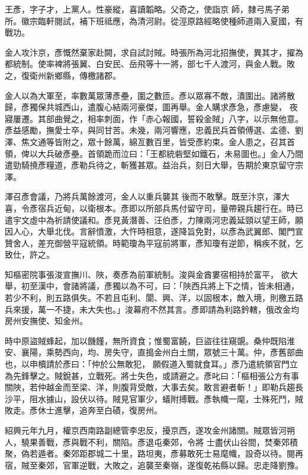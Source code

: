 \begin{pinyinscope}
 王彥，字子才，上黨人。性豪縱，喜讀韜略。父奇之，使詣京
 師，隸弓馬子弟所。徽宗臨軒閱試，補下班祗應，為清河尉。從涇原路經略使種師道兩入夏國，有戰功。



 金人攻汴京，彥慨然棄家赴闕，求自試討賊。時張所為河北招撫使，異其才，擢為都統制。使率裨將張翼、白安民、岳飛等十一將，部七千人渡河，與金人戰。敗之，復衛州新鄉縣，傳檄諸郡。



 金人以為大軍至，率數萬眾薄彥壘，圍之數匝。彥以眾寡不敵，潰圍出。諸將散歸，彥獨保共城西山，遣腹心結兩河豪傑，圖再舉。金人購求彥急，彥慮變，
 夜寢屢遷。其部曲覺之，相率刺面，作「赤心報國，誓殺金賊」八字，以示無他意。彥益感勵，撫愛士卒，與同甘苦。未幾，兩河響應，忠義民兵首領傅選、孟德、劉澤、焦文通等皆附之，眾十餘萬，綿亙數百里，皆受彥約束。金人患之，召其首領，俾以大兵破彥壘。首領跪而泣曰：「王都統砦堅如鐵石，未易圖也。」金人乃間遣勁騎撓彥糧道，彥勒兵待之，斬獲甚眾。益治兵，刻日大舉，告期於東京留守宗澤。



 澤召彥會議，乃將兵萬餘渡河，金人以重兵襲其
 後而不敢擊。既至汴京，澤大喜，令彥宿兵近甸，以衛根本。彥即以所部兵馬付留守司，量帶親兵趨行在。時已遣宇文虛中為祈請使議和。彥見黃潛善、汪伯彥，力陳兩河忠義延頸以望王師，願因人心，大舉北伐。言辭憤激，大忤時相意，遂降旨免對，以彥為武翼郎、閣門宣贊舍人，差充御營平寇統領。時範瓊為平寇前將軍，彥知瓊有逆節，稱疾不就，乞致仕，許之。



 知樞密院事張浚宣撫川、陜，奏彥為前軍統制。浚與金酋婁宿相持於富平，
 欲大舉，初至漢中，會諸將議，彥獨以為不可，曰：「陜西兵將上下之情，皆未相通，若少不利，則五路俱失。不若且屯利、閬、興、洋，以固根本，敵入境，則檄五路兵來援，萬一不捷，未大失也。」浚幕府不然其言。彥即請為利路鈐轄，俄改金均房州安撫使、知金州。



 時中原盜賊蜂起，加以饑饉，無所資食；惟蜀富饒，巨盜往往窺覬。桑仲既陷淮安、襄陽，乘勢西向，均、房失守，直搗金州白土關，眾號三十萬。仲，彥舊部曲也，以申櫝請於彥曰：「仲於公無敢犯，
 願假道入蜀就食耳。」彥乃遣統領官門立為先鋒擊之。賊銳甚，立戰死。將士失色，或請避之。彥叱曰：「樞相張公方有事關陜，若仲越金而至梁、洋，則腹背受敵，大事去矣。敢言避者斬！」即勒兵趨長沙平，阻水據山，設伏以待。賊見官軍少，蟻附搏戰。彥執幟一麾，士殊死鬥，賊敗走。彥休士進擊，追奔至白磧，復房州。



 紹興元年九月，權京西南路副總管李忠反，擾京西，遂攻金州諸關。賊眾皆河朔人，驍果善戰，彥與戰不利，關陷。彥退屯秦郊，令將
 士盡伏山谷間，焚秦郊積聚，偽若遁者。秦郊距郡城二十里，路坦夷，彥募敢死士易麾幟，設奇以待。閱再宿，賊至秦郊，官軍逆戰，大敗之，追襲至秦嶺，遂復乾祐縣以歸。忠走降劉豫。




\end{pinyinscope}
